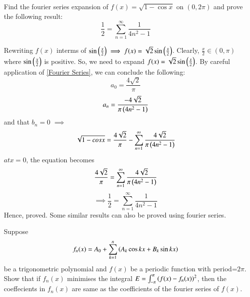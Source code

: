 \documentclass[journal,12pt,twocolumn]{IEEEtran}
\begin{document}
\begin{problem}
Find the fourier series expansion of $f(x)=\sqrt{1-\cos x}$ on $(0,2\pi)$ and prove the following result:
\begin{equation}
\frac{1}{2}=\sum_{n=1}^{\infty}\frac{1}{4n^2-1}
\end{equation} 
\end{problem}
\solution 
Rewriting $f(x)$ interms of $\sin\left(\frac{x}{2}\right) \implies f(x)=\sqrt{2}\sin\left(\frac{x}{2}\right)$. Clearly, $\frac{x}{2} \in (0,\pi)$ where $\sin\left(\frac{x}{2}\right)$ is positive. So, we need to expand $f(x)=\sqrt{2}\sin\left(\frac{x}{2}\right)$. By careful application of \ref{Fourier Series}, we can conclude the following:
\begin{equation}
a_0=\frac{4\sqrt{2}}{\pi}
\end{equation}
\begin{equation}
a_n=\frac{-4\sqrt{2}}{\pi\left(4n^2-1\right)}
\end{equation}  
and that $b_n=0$
$\implies$ \begin{equation}
\sqrt{1-cos x}=\frac{4\sqrt{2}}{\pi}-\sum_{n=1}^{\infty}\frac{4\sqrt{2}}{\pi\left(4n^2-1\right)}
\end{equation}
$at x=0$, the equation becomes 
\begin{equation}
\frac{4\sqrt{2}}{\pi}=\sum_{n=1}^{\infty}\frac{4\sqrt{2}}{\pi\left(4n^2-1\right)}
\end{equation}
\begin{equation}
\implies \frac{1}{2}=\sum_{n=1}^{\infty}\frac{1}{4n^2-1}
\end{equation}
Hence, proved. Some similar results can also be proved using fourier series.
\begin{problem}
Suppose 
\begin{equation}
f_n(x)=A_0+\sum_{k=1}^{n}\left(A_k\cos kx + B_k\sin kx\right)
\end{equation}
be a trigonometric polynomial and $f(x)$ be a periodic function with period=$2\pi$. Show that if $f_n(x)$ minimises the integral $E=\int_{-\pi}^{\pi}\left(f(x)-f_n(x)\right)^2$, then the coeffecients in $f_n(x)$ are same as the coefficients of the fourier series of $f(x)$.
\end{problem}
\end{document}
